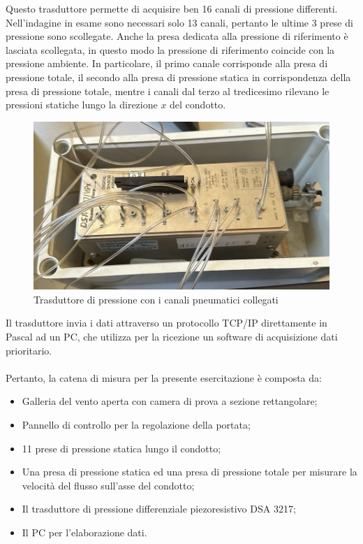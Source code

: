 \noindent Questo trasduttore permette di acquisire ben 16 canali di pressione differenti. Nell'indagine in esame sono necessari solo 13 canali, pertanto le ultime 3 prese di pressione sono scollegate. Anche la presa dedicata alla pressione di riferimento è lasciata scollegata, in questo modo la pressione di riferimento coincide con la pressione ambiente.
\newpage
\noindent In particolare, il primo canale corrisponde alla presa di pressione totale, il secondo alla presa di pressione statica in corrispondenza della presa di pressione totale, mentre i canali dal terzo al tredicesimo rilevano le pressioni statiche lungo la direzione $x$ del condotto.
\begin{figure}[H]
    \centering
    \includegraphics[width=.75\textwidth]{images/7/trasd.jpg}
    \caption{Trasduttore di pressione con i canali pneumatici collegati}
\end{figure}

\noindent Il trasduttore invia i dati attraverso un protocollo TCP/IP direttamente in Pascal ad un PC, che utilizza per la ricezione un software di acquisizione dati prioritario.\\\\
Pertanto, la catena di misura per la presente esercitazione è composta da:
\begin{itemize}
    \item Galleria del vento aperta con camera di prova a sezione rettangolare;
    \item Pannello di controllo per la regolazione della portata;
    \item 11 prese di pressione statica lungo il condotto;
    \item Una presa di pressione statica ed una presa di pressione totale per misurare la velocità del flusso sull'asse del condotto;
    \item Il trasduttore di pressione differenziale piezoresistivo DSA 3217;
    \item Il PC per l'elaborazione dati.
\end{itemize}

